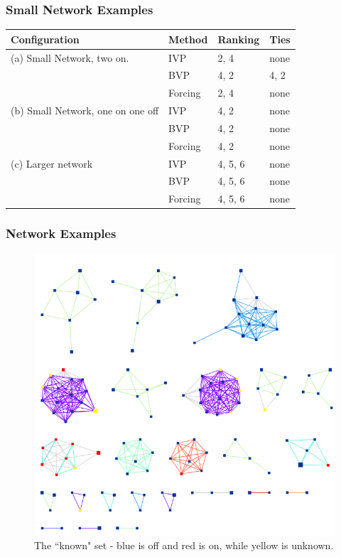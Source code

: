 \documentclass{beamer}
\begin{document}
\begin{frame}
\frametitle{Small Network Examples}
	\begin{center}
		\begin{tabular}{|l|l|l|l|}
			\hline Configuration & Method & Ranking & Ties\\
			\hline
			(a) Small Network, two on. &  IVP & 2, 4 & none  \\ \cline{2-4}
			& BVP & 4, 2 & 4, 2 \\ \cline{2-4}
			& Forcing & 2, 4 & none \\
			\hline
			(b) Small Network, one on one off &  IVP & 4, 2 &none \\ \cline{2-4}
			& BVP &4, 2 & none  \\ \cline{2-4}
			& Forcing &4, 2 & none\\
			\hline
			(c) Larger network &  IVP & 4, 5, 6& none \\ \cline{2-4}
			& BVP & 4, 5, 6&  none\\ \cline{2-4}
			& Forcing &  4, 5, 6& none \\
			\hline
		\end{tabular}
	\end{center}
\end{frame}
\begin{frame}
\frametitle{Network Examples}
\begin{figure}
		\begin{center}
	\includegraphics[scale = 0.25]{../ranked_known_nodes.png}	
\end{center}
\caption{The ``known" set - blue is off and red is on, while yellow is unknown.}
\end{figure}
\end{frame}
\end{document}
